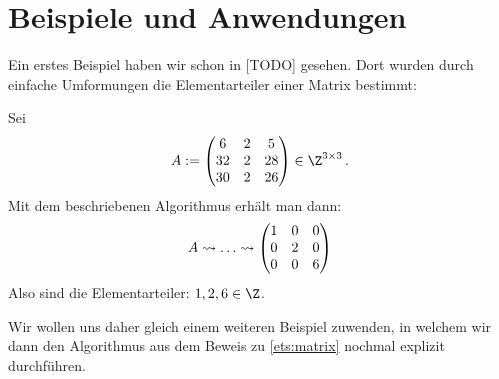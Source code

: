 
\chapter{Beispiele und Anwendungen}
Ein erstes Beispiel haben wir schon in [TODO] %
gesehen. Dort wurden durch einfache Umformungen die Elementarteiler einer Matrix
bestimmt:

\begin{thBeisp} %
    Sei 
    \[ A := \Matrix{
           6 & 2 &  5 \\
          32 & 2 & 28 \\
          30 & 2 & 26  } \in \Z^{3\times3}
    \,. \]
    Mit dem beschriebenen Algorithmus erhält man dann:
    \[
        A
        \rightsquigarrow \ldots
        \rightsquigarrow 
    \begin{pmatrix} 
        1 & 0 & 0 \\
        0 & 2 & 0 \\
        0 & 0 & 6   \end{pmatrix}
    \]
    Also sind die Elementarteiler: $1,2,6 \in\Z$.
\end{thBeisp}

Wir wollen uns daher gleich einem weiteren Beispiel zuwenden, in welchem wir
dann den Algorithmus aus dem Beweis zu \cref{ets:matrix} nochmal explizit
durchführen.

